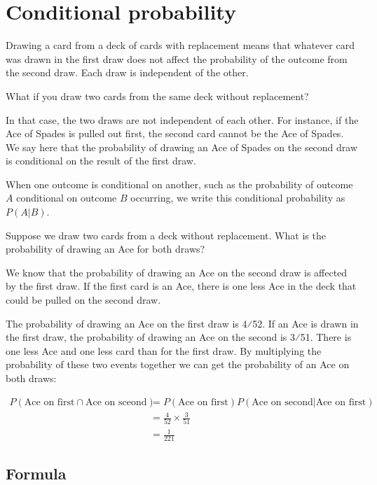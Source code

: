 \documentclass[
  letterpaper,
  DIV=11,
  numbers=noendperiod]{scrreprt}
\begin{document}
\hypertarget{conditional-probability}{%
\section{Conditional probability}\label{conditional-probability}}

Drawing a card from a deck of cards with replacement means that whatever
card was drawn in the first draw does not affect the probability of the
outcome from the second draw. Each draw is independent of the other.

What if you draw two cards from the same deck without replacement?

In that case, the two draws are not independent of each other. For
instance, if the Ace of Spades is pulled out first, the second card
cannot be the Ace of Spades. We say here that the probability of drawing
an Ace of Spades on the second draw is conditional on the result of the
first draw.

When one outcome is conditional on another, such as the probability of
outcome \(A\) conditional on outcome \(B\) occurring, we write this
conditional probability as \(P(A|B)\).

Suppose we draw two cards from a deck without replacement. What is the
probability of drawing an Ace for both draws?

We know that the probability of drawing an Ace on the second draw is
affected by the first draw. If the first card is an Ace, there is one
less Ace in the deck that could be pulled on the second draw.

The probability of drawing an Ace on the first draw is 4⁄52. If an Ace
is drawn in the first draw, the probability of drawing an Ace on the
second is 3⁄51. There is one less Ace and one less card than for the
first draw. By multiplying the probability of these two events together
we can get the probability of an Ace on both draws:

\begin{align*}
P(\text{Ace on first}\cap\text{Ace on sceond})&=P(\text{Ace on first})P(\text{Ace on second}|\text{Ace on first}) \\
&=\frac{4}{52}\times \frac{3}{51} \\
&=\frac{1}{221}
\end{align*}

\hypertarget{formula}{%
\subsection{Formula}\label{formula}}
\end{document}
